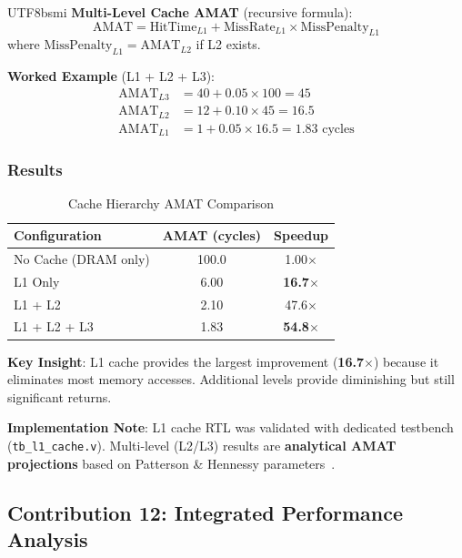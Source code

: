 \documentclass[journal,twoside]{IEEEtran}
\begin{document}
\begin{CJK}{UTF8}{bsmi}
\textbf{Multi-Level Cache AMAT} (recursive formula):
\begin{equation}
\text{AMAT} = \text{HitTime}_{L1} + \text{MissRate}_{L1} \times \text{MissPenalty}_{L1}
\end{equation}
where $\text{MissPenalty}_{L1} = \text{AMAT}_{L2}$ if L2 exists.

\textbf{Worked Example} (L1 + L2 + L3):
\begin{align*}
\text{AMAT}_{L3} &= 40 + 0.05 \times 100 = 45 \\
\text{AMAT}_{L2} &= 12 + 0.10 \times 45 = 16.5 \\
\text{AMAT}_{L1} &= 1 + 0.05 \times 16.5 = 1.83 \text{ cycles}
\end{align*}

\subsubsection{Results}
\begin{table}[!t]
\centering
\caption{Cache Hierarchy AMAT Comparison}
\label{tab:amat}
\footnotesize
\begin{tabular}{@{}lcc@{}}
\toprule
\textbf{Configuration} & \textbf{AMAT (cycles)} & \textbf{Speedup} \\
\midrule
No Cache (DRAM only) & 100.0 & 1.00$\times$ \\
L1 Only & 6.00 & \textbf{16.7$\times$} \\
L1 + L2 & 2.10 & 47.6$\times$ \\
L1 + L2 + L3 & 1.83 & \textbf{54.8$\times$} \\
\bottomrule
\end{tabular}
\end{table}

\textbf{Key Insight}: L1 cache provides the largest improvement (\textbf{16.7$\times$}) because it eliminates most memory accesses. Additional levels provide diminishing but still significant returns.

\textbf{Implementation Note}: L1 cache RTL was validated with dedicated testbench (\texttt{tb\_l1\_cache.v}). Multi-level (L2/L3) results are \textbf{analytical AMAT projections} based on Patterson \& Hennessy parameters~\cite{hennessy2017computer}.

\subsection{Contribution 12: Integrated Performance Analysis}


\end{CJK}
\end{document}
